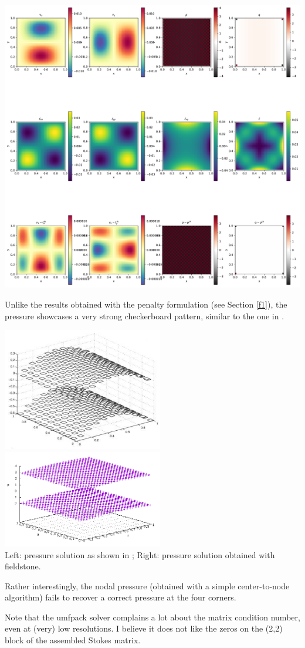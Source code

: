 \includegraphics[width=16cm]{python_codes/fieldstone_14/solution.pdf}

Unlike the results obtained with the penalty formulation (see Section \ref{f1}),
the pressure showcases a very strong checkerboard pattern, similar to the one 
in \cite{dohu03}.

\begin{center}
\includegraphics[width=7cm]{python_codes/fieldstone_14/doneahuerta}
\includegraphics[width=7cm]{python_codes/fieldstone_14/mine}\\
Left: pressure solution as shown in \cite{dohu03}; Right: pressure solution obtained
with fieldstone.
\end{center}

Rather interestingly, the nodal pressure (obtained with a simple center-to-node algorithm)
fails to recover a correct pressure at the four corners.

Note that the umfpack solver complains a lot about the matrix condition number, 
even at (very) low resolutions. I believe it does not like the zeros on the (2,2)
block of the assembled Stokes matrix. 
